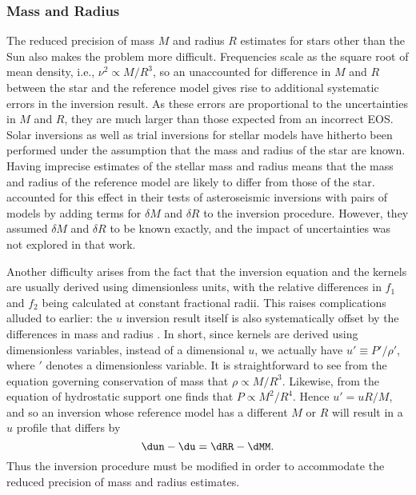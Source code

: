 \subsubsection*{Mass and Radius}
The reduced precision of mass $M$ and radius $R$ estimates for stars other than the Sun also makes the problem more difficult. 
Frequencies scale as the square root of mean density, i.e., ${\nu^2 \propto M/R^3}$, so an unaccounted for difference in $M$ and $R$ between the star and the reference model gives rise to additional systematic errors in the inversion result. 
As these errors are proportional to the uncertainties in $M$ and $R$, they are much larger than those expected from an incorrect EOS. 
Solar inversions as well as trial inversions for stellar models have hitherto been performed under the assumption that the mass and radius of the star are known. 
Having imprecise estimates of the stellar mass and radius means that the mass and radius of the reference model are likely to differ from those of the star. 
\citet{2001ESASP.464..411B} accounted for this effect in their tests of asteroseismic inversions with pairs of models by adding terms for $\delta M$ and $\delta R$ to the inversion procedure. 
However, they assumed $\delta M$ and $\delta R$ to be known exactly, and the impact of uncertainties was not explored in that work. 


Another difficulty arises from the fact that the inversion equation and the kernels are usually derived using dimensionless units, with the relative differences in $f_1$ and $f_2$ being calculated at constant fractional radii.
This raises complications alluded to earlier: the $u$ inversion result itself is also systematically offset by the differences in mass and radius \citep{2003Ap&SS.284..153B}.
In short, since kernels are derived using dimensionless variables, instead of a dimensional $u$, we actually have ${u' \equiv P'/\rho'}$, where $'$ denotes a dimensionless variable. 
It is straightforward to see from the equation governing conservation of mass that ${\rho \propto M/R^3}$. 
Likewise, from the equation of hydrostatic support one finds that ${P \propto M^2/R^4}$. 
Hence ${u'=uR/M}$, and so an inversion whose reference model has a different $M$ or $R$ will result in a $u$ profile that differs by
\begin{equation} \label{eq:MR}
    \dun - \du = \dRR - \dMM.
\end{equation}
Thus the inversion procedure must be modified in order to accommodate the reduced precision of mass and radius estimates. 

